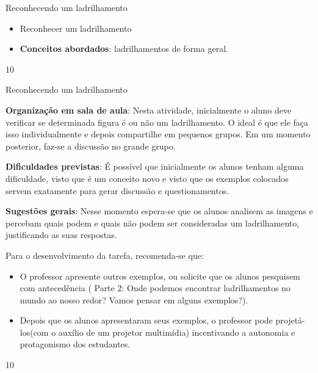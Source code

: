 \begin{objectives}{Reconhecendo um ladrilhamento}
{
	\begin{itemize}
	\item Reconhecer um ladrilhamento
	\item \textbf{Conceitos abordados}: ladrilhamentos de forma geral.
	\end{itemize}
}{1}{0}
\end{objectives}
\begin{sugestions}{Reconhecendo um ladrilhamento}
{
	\textbf{Organização em sala de aula}: Nesta atividade, inicialmente o aluno deve verificar se determinada figura é ou não um ladrilhamento. O ideal é que ele faça isso individualmente e depois compartilhe em pequenos grupos. Em um momento posterior, faz-se a discussão no grande grupo.

	\textbf{Dificuldades previstas}: É possível que inicialmente os alunos tenham alguma dificuldade, visto que é um conceito novo e visto que os exemplos colocados servem exatamente para gerar discussão e questionamentos. 

	\textbf{Sugestões gerais}: Nesse momento espera-se que os alunos analisem as imagens e percebam quais podem e quais não podem ser consideradas um ladrilhamento, justificando as suas respostas.

	Para o desenvolvimento da tarefa, recomenda-se que: 
	\begin{itemize}
	\item O professor apresente outros exemplos, ou solicite que os alunos pesquisem com antecedência ( Parte 2: Onde podemos encontrar ladrilhamentos no mundo ao nosso redor? Vamos pensar em alguns exemplos?).
	\item Depois que os alunos apresentaram seus exemplos, o professor pode projetá-los(com o auxílio de um projetor multimídia) incentivando a autonomia e protagonismo dos estudantes. 
	\end{itemize}
}{1}{0}
\end{sugestions}
